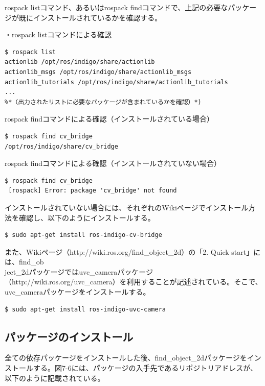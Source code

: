rospack listコマンド、あるいはrospack findコマンドで、上記の必要なパッケージが既にインストールされているかを確認する。

・rospack listコマンドによる確認
\begin{lstlisting}[language=ROS]
$ rospack list
actionlib /opt/ros/indigo/share/actionlib
actionlib_msgs /opt/ros/indigo/share/actionlib_msgs
actionlib_tutorials /opt/ros/indigo/share/actionlib_tutorials
...
%*（出力されたリストに必要なパッケージが含まれているかを確認）*)
\end{lstlisting}

rospack findコマンドによる確認（インストールされている場合）

\begin{lstlisting}[language=ROS]
$ rospack find cv_bridge
/opt/ros/indigo/share/cv_bridge
\end{lstlisting}

rospack findコマンドによる確認（インストールされていない場合）

\begin{lstlisting}[language=ROS]
$ rospack find cv_bridge
 [rospack] Error: package 'cv_bridge' not found
\end{lstlisting}

インストールされていない場合には、それぞれのWikiページでインストール方法を確認し、以下のようにインストールする。

\begin{lstlisting}[language=ROS]
$ sudo apt-get install ros-indigo-cv-bridge
\end{lstlisting}

また、Wikiページ（http://wiki.ros.org/find\_object\_2d）の「2. Quick start」には、find\_ob\\ject\_2dパッケージではuvc\_cameraパッケージ（http://wiki.ros.org/uvc\_camera）を利用することが記述されている。そこで、uvc\_cameraパッケージをインストールする。

\begin{lstlisting}[language=ROS]
$ sudo apt-get install ros-indigo-uvc-camera
\end{lstlisting}

\subsection{パッケージのインストール}

全ての依存パッケージをインストールした後、find\_object\_2dパッケージをインストールする。図7-6には、パッケージの入手先であるリポジトリアドレスが、以下のように記載されている。

